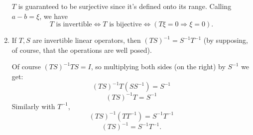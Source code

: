 \documentclass{article}
\theoremstyle{exercisestyle}
\newenvironment{exercise}[1]
  {\renewcommand\theinnerex{#1}\innerex}
  {\endinnerex}
\begin{document}
\begin{exercise}{1.1.5}
\begin{enumerate}
              $T$ is guaranteed to be surjective since it's defined onto its range. Calling $a-b = \xi$, we have
              $$ T \text{ is invertible} \Leftrightarrow T \text{ is bijective} \Leftrightarrow (T\xi = 0 \Rightarrow \xi = 0). $$

        \item  If $T, S$ are invertible linear operators, then $(T S)^{-1} = S^{-1} T^{-1}$ (by supposing,
              of course, that the operations are well posed).

              Of course $(T S)^{-1} TS = I$, so multiplying both sides (on the right) by $S^{-1}$ we get:
              $$ (T S)^{-1} T(S S^{-1}) = S^{-1} $$
              $$ (T S)^{-1} T = S^{-1} $$
              Similarly with $T^{-1}$,
              $$ (T S)^{-1}(T T^{-1}) = S^{-1}T^{-1}$$
              $$ (T S)^{-1} = S^{-1}T^{-1}.$$

    \end{enumerate}

\end{exercise}
\end{document}

